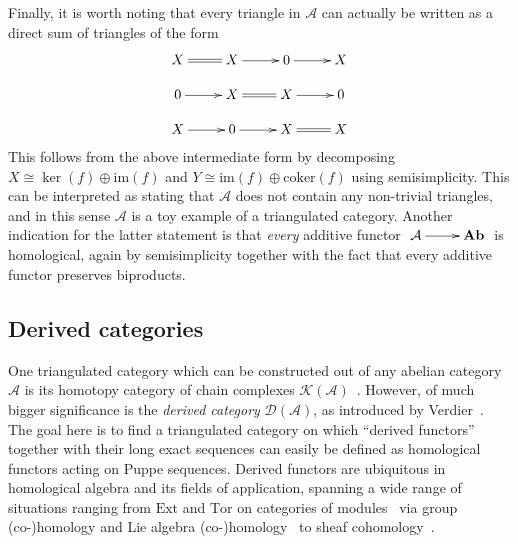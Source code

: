 \documentclass{amsproc}
\theoremstyle{definition}
\begin{document}
Finally, it is worth noting that every triangle in ${\mathcal{A}}$ can actually be written as a direct sum of triangles of the form
\[
\xymatrix@R-1pc{ X \ar@{=}[r] & X \ar[r] & 0 \ar[r] & X \\
		 0 \ar[r] & X \ar@{=}[r] & X \ar[r] & 0 \\
		 X \ar[r] & 0 \ar[r] & X \ar@{=}[r] & X }
\]
This follows from the above intermediate form by decomposing $X\cong \ker(f)\oplus{\mathrm{im}}(f)$ and $Y\cong {\mathrm{im}}(f)\oplus {\mathrm{coker}}(f)$ using semisimplicity. This can be interpreted as stating that ${\mathcal{A}}$ does not contain any non-trivial triangles, and in this sense ${\mathcal{A}}$ is a toy example of a triangulated category. Another indication for the latter statement is that \emph{every} additive functor $\xymatrix{ {\mathcal{A}} \ar[r] & {\mathbf{Ab}} }$ is homological, again by semisimplicity together with the fact that every additive functor preserves biproducts.

\subsection{Derived categories}
\label{derived}

One triangulated category which can be constructed out of any abelian category ${\mathcal{A}}$ is its homotopy category of chain complexes ${\mathcal{K}}({\mathcal{A}})$~\cite[Prop.~10.2.4]{Weibel}. However, of much bigger significance is the \emph{derived category} ${\mathcal{D}}({\mathcal{A}})$, as introduced by Verdier~\cite{Ver}. The goal here is to find a triangulated category on which ``derived functors'' together with their long exact sequences can easily be defined as homological functors acting on Puppe sequences. Derived functors are ubiquitous in homological algebra and its fields of application, spanning a wide range of situations ranging from $\mathrm{Ext}$ and $\mathrm{Tor}$ on categories of modules~\cite[Ch.~2]{Weibel} via group (co-)homology and Lie algebra (co-)homology~\cite[Ch.~6/7]{Weibel} to sheaf cohomology~\cite[Sec.~III.8]{GM}.
\end{document}
